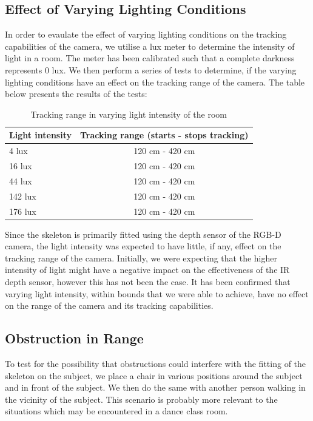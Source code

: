 \documentclass[10pt]{article}
\begin{document}
\subsection{Effect of Varying Lighting Conditions}
\noindent
In order to evaulate the effect of varying lighting conditions on the tracking capabilities of the camera, we utilise a lux meter to determine the intensity of light in a room. The meter has been calibrated such that a complete darkness represents 0 lux. We then perform a series of tests to determine, if the varying lighting conditions have an effect on the tracking range of the camera. The table below presents the results of the tests:
\begin{table}[h]
\center
\begin{tabular}{ | l | c |}
\hline
Light intensity & Tracking range (starts - stops tracking) \\
\hline
4 lux & 120 cm - 420 cm\\
16 lux & 120 cm - 420 cm\\
44 lux & 120 cm - 420 cm\\
142 lux & 120 cm - 420 cm\\
176 lux & 120 cm - 420 cm\\
\hline
\end{tabular}
\caption{Tracking range in varying light intensity of the room}
\label{cam_range_varying_light}
\end{table}

\noindent
Since the skeleton is primarily fitted using the depth sensor of the RGB-D camera, the light intensity was expected to have little, if any, effect on the tracking range of the camera. Initially, we were expecting that the higher intensity of light might have a negative impact on the effectiveness of the IR depth sensor, however this has not been the case. It has been confirmed that varying light intensity, within bounds that we were able to achieve, have no effect on the range of the camera and its tracking capabilities.

\subsection{Obstruction in Range}
\noindent
To test for the possibility that obstructions could interfere with the fitting of the skeleton on the subject, we place a chair in various positions around the subject and in front of the subject. We then do the same with another person walking in the vicinity of the subject. This scenario is probably more relevant to the situations which may be encountered in a dance class room.  
\end{document}
